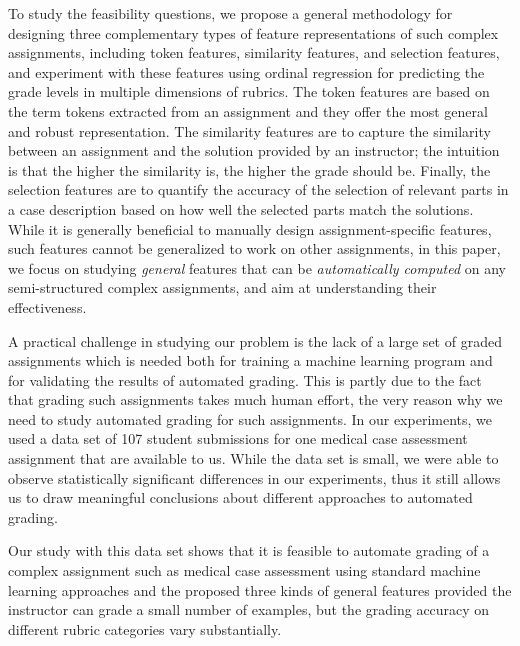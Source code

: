 To study the feasibility questions, we propose a general methodology for designing three
complementary types of feature representations of such complex assignments,
including token features, similarity features, and selection features, and experiment
with these features using ordinal regression for predicting the grade levels in multiple
dimensions of rubrics.  The
token features are based on the term tokens extracted from an assignment
and they offer the most general and robust representation. The similarity
features are to capture the similarity between an assignment and the
solution provided by an instructor; the intuition is that the higher the
similarity is, the higher the grade should be.  Finally, the selection
features are to quantify the accuracy of the selection of relevant parts in
a case description based on how well the selected parts match the
solutions.  While it is generally beneficial to manually design
assignment-specific features, such features cannot be generalized to work
on other assignments, in this paper, we focus on studying {\em general}
features that can be {\em automatically computed} on any semi-structured
complex assignments, and aim at understanding their effectiveness.

A practical challenge in studying our problem is the lack of a large set of
graded assignments which is needed both for training a machine learning
program and for validating the results of automated grading. This is partly
due to the fact that grading such assignments takes much human effort, the
very reason why we need to study automated grading for such assignments. In
our experiments, we used a data set of 107 student submissions for one
medical case assessment assignment that are available to us. While the data
set is small, we were able to observe statistically significant differences
in our experiments, thus it still allows us to draw meaningful conclusions
about different approaches to automated grading. 

Our study with this data set shows that it is feasible to automate grading of 
a complex assignment such as medical case assessment using standard
 machine learning approaches and the proposed three kinds of general features 
provided the instructor can grade a small number of examples, but 
the grading accuracy on different rubric categories vary substantially. 

